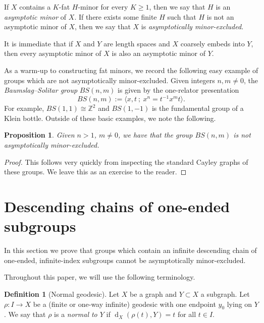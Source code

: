 \documentclass[10pt,a4paper]{amsart}
\DeclareMathOperator{\dist}{d}
\newcommand{\Z}{\mathbb{Z}}
\newcommand{\pres}[2]{\langle #1 \ ; \ #2 \rangle}
\newtheorem{proposition}[theorem]{Proposition}
\theoremstyle{definition}
\newtheorem{definition}[theorem]{Definition}
\begin{document}
If $X$ contains a $K$-fat $H$-minor for every $K \geq 1$, then we say that $H$ is an \textit{asymptotic minor} of $X$. If there exists some finite $H$ such that $H$ is not an asymptotic minor of $X$, then we say that $X$ is \textit{asymptotically minor-excluded}. 

It is immediate that if $X$ and $Y$ are length spaces and $X$ coarsely embeds into $Y$, then every asymptotic minor of $X$ is also an asymptotic minor of $Y$.

As a warm-up to constructing fat minors, we record the following easy example of groups which are not asymptotically minor-excluded. 
Given integers $n, m \neq 0$, the \textit{Baumslag--Solitar group} $BS(n,m)$ is given by the one-relator presentation
$$
BS(n,m) := \pres{x,t}{x^n = t^{-1} x^m t}.
$$
For example, $BS(1,1) \cong \Z^2$ and $BS(1,-1)$ is the fundamental group of a Klein bottle. Outside of these basic examples, we note the following. 

\begin{proposition}\label{lem:bs}
    Given $n > 1$, $m \neq 0$, we have that the group $BS(n,m)$ is not asymptotically minor-excluded.
\end{proposition}
     

\begin{proof}
    This follows very quickly from inspecting the standard  Cayley graphs of these groups. We leave this as an exercise to the reader. 
\end{proof}




\section{Descending chains of one-ended subgroups}\label{sec:desc-chain}

In this section we prove that groups which contain an infinite descending chain of one-ended, infinite-index subgroups cannot be asymptotically minor-excluded. 

Throughout this paper, we will use the following terminology. 

\begin{definition}[Normal geodesic]\label{def:normal}
	Let $X$ be a graph and $Y \subset X$ a subgraph. 
    Let $\rho : I \to X$ be a (finite or one-way infinite) geodesic with one endpoint $y_0$ lying on $Y$. We say that $\rho$ is a \textit{normal to $Y$} if 
    $
    \dist_X(\rho(t), Y) = t
    $
    for all $t \in I$. 
\end{definition}
 
\end{document}

